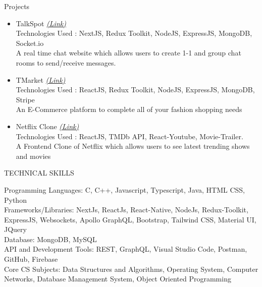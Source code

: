 \documentclass{resume} %
\begin{document}
\begin{rSection}{Projects}
   \begin{itemize}

    \item TalkSpot
   \href{https://github.com/tushargahlaut/talkspot-chat-app}{\emph{(Link)}} 
   \\Technologies Used : NextJS, Redux Toolkit, NodeJS, ExpressJS, MongoDB, Socket.io 
   \\{\normalfont A real time chat website which allows users to create 1-1 and group chat rooms to send/receive messages.}
   
   \item TMarket
   \href{https://github.com/tushargahlaut/TMarket}{\emph{(Link)}}
   \\Technologies Used : ReactJS, Redux Toolkit, NodeJS, ExpressJS, MongoDB, Stripe
   \\{\normalfont An E-Commerce platform to complete all of your fashion shopping needs}

    \item Netflix Clone
   \href{https://netflix-clone-df7878.netlify.app/}{\emph{(Link)}} 
   \\Technologies Used : ReactJS, TMDb API, React-Youtube, Movie-Trailer. 
   \\{\normalfont A Frontend Clone of Netflix which allows users to see latest trending shows and movies}
   
   \end{itemize}
\end{rSection}

\begin{rSection}{TECHNICAL SKILLS}


Programming Languages: {\normalfont C, C++, Javascript, Typescript, Java, HTML CSS, Python}
\\
Frameworks/Libraries: {\normalfont NextJs, ReactJs, React-Native, NodeJs, Redux-Toolkit, ExpressJS,  Websockets, Apollo GraphQL, Bootstrap, Tailwind CSS, Material UI, JQuery}
 \\
 Database: {\normalfont MongoDB, MySQL}
 \\
 API and Development Tools: {\normalfont REST, GraphQL, Visual Studio Code, Postman, GitHub, Firebase}
 \\
 Core CS Subjects: {\normalfont Data Structures and Algorithms, Operating System, Computer Networks, Database Management System, Object Oriented Programming}
 


\end{rSection}
\end{document}
